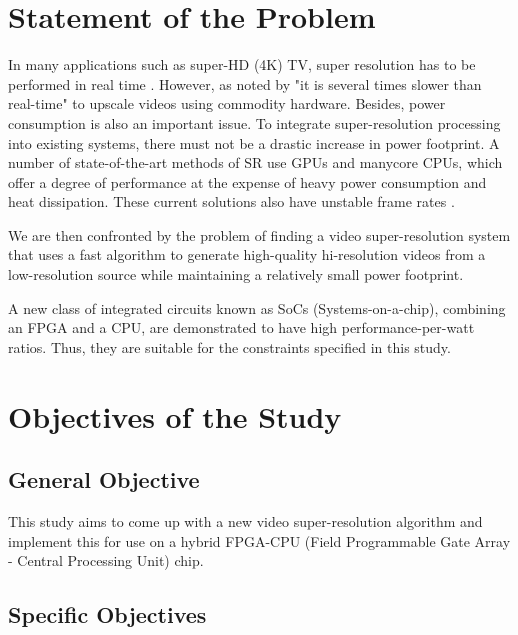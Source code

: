 
\section{Statement of the Problem}

In many applications such as super-HD (4K) TV, super resolution has to be performed in real time \citep{Shen2014}. However, as noted by \cite{Ishizaka2013} "it is several times slower than real-time" to upscale videos using commodity hardware.
Besides, power consumption is also an important issue. 
To integrate super-resolution processing into existing systems, there must not be a drastic increase in power footprint. 
A number of state-of-the-art methods of SR use GPUs and manycore CPUs, which offer a degree of performance at the expense of heavy power consumption and heat dissipation. 
These current solutions also have unstable frame rates \citep{Wu2011}. 

We are then confronted by the problem of finding a video super-resolution system that uses a fast algorithm to generate high-quality hi-resolution videos from a low-resolution source while maintaining a relatively small power footprint.

A new class of integrated circuits known as SoCs (Systems-on-a-chip), combining an FPGA and a CPU, are demonstrated to have high performance-per-watt ratios. %
Thus, they are suitable for the constraints specified in this study.

\section{Objectives of the Study}

\subsection{General Objective}

This study aims to come up with a new video super-resolution algorithm and implement this for use on a hybrid FPGA-CPU (Field Programmable Gate Array - Central Processing Unit) chip.


\subsection{Specific Objectives}

